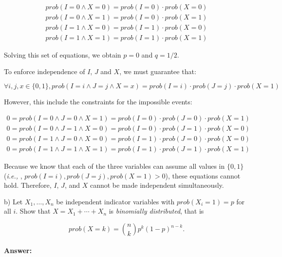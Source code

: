 \documentclass[a4paper]{article}
\newcommand{\ie}{\emph{i.e.,} }
\begin{document}
\begin{align*}
{prob}(I = 0 \wedge X = 0) = {prob}(I = 0) \cdot {prob}(X = 0) \\
{prob}(I = 0 \wedge X = 1) = {prob}(I = 0) \cdot {prob}(X = 1) \\
{prob}(I = 1 \wedge X = 0) = {prob}(I = 1) \cdot {prob}(X = 0) \\
{prob}(I = 1 \wedge X = 1) = {prob}(I = 1) \cdot {prob}(X = 1)
\end{align*}

Solving this set of equations, we obtain $p = 0$ and $q = 1/2$.

\bigskip
To enforce independence of $I$, $J$ and $X$, we must guarantee that:

$$ \forall i, j, x \in \{0,1\}, {prob}(I = i \wedge J = j \wedge X = x) = {prob}(I = i) \cdot {prob}(J = j) \cdot {prob}(X = 1) $$

However, this include the constraints for the impossible events:

\begin{align*}
0 = {prob}(I = 0 \wedge J = 0 \wedge X = 1) = {prob}(I = 0) \cdot {prob}(J = 0) \cdot {prob}(X = 1) \\
0 = {prob}(I = 0 \wedge J = 1 \wedge X = 0) = {prob}(I = 0) \cdot {prob}(J = 1) \cdot {prob}(X = 0) \\
0 = {prob}(I = 1 \wedge J = 0 \wedge X = 0) = {prob}(I = 1) \cdot {prob}(J = 0) \cdot {prob}(X = 0) \\
0 = {prob}(I = 1 \wedge J = 1 \wedge X = 1) = {prob}(I = 1) \cdot {prob}(J = 1) \cdot {prob}(X = 1)
\end{align*}

Because we know that each of the three variables can assume all values in $\{0, 1\}$ (\ie, ${prob}(I = i), {prob}(J = j), {prob}(X = 1) > 0$), these equations cannot hold. Therefore, $I$, $J$, and $X$ cannot be made independent simultaneously.

\bigskip \noindent b) Let $X_1, \ldots, X_n$ be independent indicator variables with ${prob}(X_i = 1) = p$ for all $i$. Show that $X = X_1 + \cdots + X_n$ is \emph{binomially distributed}, that is

$${prob}(X = k) = {n \choose k} p^k (1-p)^{n-k}.$$

\paragraph{Answer:}
\end{document}
